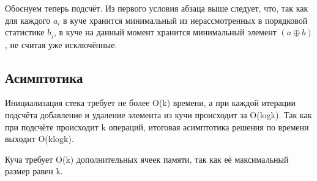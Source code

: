 Обоснуем теперь подсчёт. Из первого условия абзаца выше следует, что, так как для каждого $a_i$ в куче хранится минимальный из нерассмотренных в порядковой статистике $b_j$, в куче на данный момент хранится минимальный элемент $(a\oplus b)$, не считая уже исключённые.

\subsection{Асимптотика}
Инициализация стека требует не более O(k) времени, а при каждой итерации подсчёта добавление и удаление элемента из кучи происходит за O(logk). Так как при подсчёте происходит k операций, итоговая асимптотика решения по времени выходит O(klogk).

Куча требует O(k) дополнительных ячеек памяти, так как её максимальный размер равен k.
